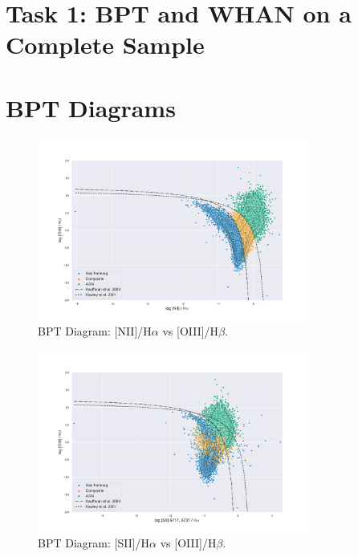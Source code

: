 \documentclass[letterpaper, oneside]{article}
\begin{document}
	
\templatePagecfg


\section*{Task 1: BPT and WHAN on a Complete Sample}



\section{BPT Diagrams}

\begin{figure}[H]
	\centering
	\includegraphics[width=0.8\textwidth]{../BPT_Diagrams/BPT_niiHa_oiiiHb.pdf}
	\caption{BPT Diagram: [NII]/H$\alpha$ vs [OIII]/H$\beta$.}
	\label{fig:BPT_niiHa_oiiiHb}
\end{figure}

\begin{figure}[H]
	\centering
	\includegraphics[width=0.8\textwidth]{../BPT_Diagrams/BPT_sii67176731Ha_oiiiHb.pdf}
	\caption{BPT Diagram: [SII]/H$\alpha$ vs [OIII]/H$\beta$.}
	\label{fig:BPT_siiHa_oiiiHb}
\end{figure}
\end{document}
